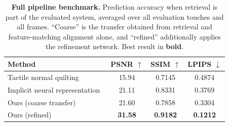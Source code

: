 \begin{table}[t]
  \centering
  \small
  \caption{\textbf{Full pipeline benchmark.} Prediction accuracy when retrieval is part of the
    evaluated system, averaged over all evaluation touches and all frames. ``Coarse'' is the
    transfer obtained from retrieval and feature-matching alignment alone, and ``refined''
    additionally applies the refinement network. Best result in \textbf{bold}.}
  \label{tab:full_pipeline}
  \begin{tabular}{l c c c}
    \hline
    Method & PSNR $\uparrow$ & SSIM $\uparrow$ & LPIPS $\downarrow$ \\
    \hline
    Tactile normal quilting~\cite{tactiledreamfusion} & 15.94 & 0.7145 & 0.4874 \\
    Implicit neural representation~\cite{objectfolder} & 21.11 & 0.8331 & 0.3769 \\
    \hline
    Ours (coarse transfer)                        & 21.60 & 0.7858 & 0.3304 \\
    Ours (refined)                                & \textbf{31.58} & \textbf{0.9182} & \textbf{0.1212} \\
    \hline
  \end{tabular}
\end{table}
